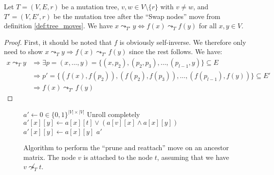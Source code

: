 \begin{lemma}
    \label{lem:swap_nodes_property}
    Let $T = (V, E, r)$ be a mutation tree, $v, w \in V \setminus \{r\}$ with $v \neq w$, and $T' = (V, E', r)$ be the mutation tree after the ``Swap nodes'' move from definition \ref{def:tree_moves}. We have $x \leadsto_{T'} y \Leftrightarrow f(x) \leadsto_T f(y)$ for all $x, y \in V$.
\end{lemma}

\begin{proof}
    First, it should be noted that $f$ is obviously self-inverse. We therefore only need to show $x \leadsto_{T} y \Rightarrow f(x) \leadsto_{T'} f(y)$ since the rest follows. We have:
    \begin{align*}
        x \leadsto_T y &\Rightarrow \exists p = (x, \dots, y) = \{(x, p_2), (p_2, p_3), \dots, (p_{l-1}, y)\} \subseteq E \\
        &\Rightarrow p' = \{(f(x), f(p_2)), (f(p_2), f(p_3)), \dots, (f(p_{l-1}), f(y))\} \subseteq E' \\
        &\Rightarrow f(x) \leadsto_{T'} f(y)
    \end{align*}
\end{proof}

\begin{figure}[p]
    \begin{algorithmic}[1]
            \State $a' \leftarrow 0 \in \{0,1\}^{|V| \times |V|}$
                 \Comment Unroll completely
                        \State $a'[x][y] \leftarrow a[x][t] \vee (a[v][x] \wedge a[x][y])$
                    \Else
                        \State $a'[x][y] \leftarrow a[x][y]$
                    \EndIf
                \EndFor
            \EndFor
            \State \Return $a'$
        \EndFunction
    \end{algorithmic}
    \caption{Algorithm to perform the ``prune and reattach'' move on an ancestor matrix. The node $v$ is attached to the node $t$, assuming that we have $v \not\leadsto_T t$.}
    \label{alg:am_prune_reattach}
\end{figure}

